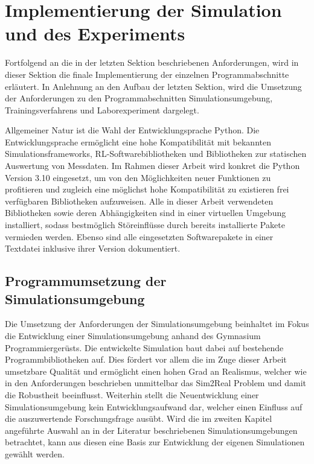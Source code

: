 \section{Implementierung der Simulation und des Experiments}

Fortfolgend an die in der letzten Sektion beschriebenen Anforderungen, wird in dieser Sektion die finale Implementierung der einzelnen Programmabschnitte erläutert.
In Anlehnung an den Aufbau der letzten Sektion, wird die Umsetzung der Anforderungen zu den Programmabschnitten Simulationsumgebung, Trainingsverfahrens und Laborexperiment dargelegt.

Allgemeiner Natur ist die Wahl der Entwicklungsprache Python.
Die Entwicklungsprache ermöglicht eine hohe Kompatibilität mit bekannten Simulationsframeworks, RL-Softwarebibliotheken und Bibliotheken zur statischen Auswertung von Messdaten.
Im Rahmen dieser Arbeit wird konkret die Python Version 3.10 eingesetzt, um von den Möglichkeiten neuer Funktionen zu profitieren und zugleich eine möglichst hohe Kompatibilität zu existieren frei verfügbaren Bibliotheken aufzuweisen.
Alle in dieser Arbeit verwendeten Bibliotheken sowie deren Abhängigkeiten sind in einer virtuellen Umgebung installiert, sodass bestmöglich Störeinflüsse durch bereits installierte Pakete vermieden werden.
Ebenso sind alle eingesetzten Softwarepakete in einer Textdatei inklusive ihrer Version dokumentiert.

\subsection{Programmumsetzung der Simulationsumgebung}

Die Umsetzung der Anforderungen der Simulationsumgebung beinhaltet im Fokus die Entwicklung einer Simulationsumgebung anhand des Gymnasium Programmiergerüsts.
Die entwickelte Simulation baut dabei auf bestehende Programmbibliotheken auf.
Dies fördert vor allem die im Zuge dieser Arbeit umsetzbare Qualität und ermöglicht einen hohen Grad an Realismus, welcher wie in den Anforderungen beschrieben unmittelbar das Sim2Real Problem und damit die Robustheit beeinflusst.
Weiterhin stellt die Neuentwicklung einer Simulationsumgebung kein Entwicklungsaufwand dar, welcher einen Einfluss auf die auszuwertende Forschungsfrage ausübt.
Wird die im zweiten Kapitel angeführte Auswahl an in der Literatur beschriebenen Simulationsumgebungen betrachtet, kann aus diesen eine Basis zur Entwicklung der eigenen Simulationen gewählt werden.

